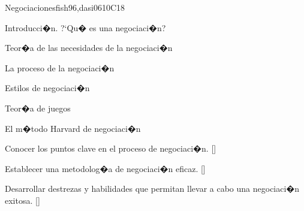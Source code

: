 \begin{syllabus}
\begin{unit}{}{Negociaciones}{fish96,dasi06}{10}{C18}
\begin{topics}
      \item Introducci�n. ?`Qu� es una negociaci�n?
      \item Teor�a de las necesidades de la negociaci�n
      \item La proceso de la negociaci�n
      \item Estilos de negociaci�n
      \item Teor�a de juegos
      \item El m�todo Harvard de negociaci�n
   \end{topics}
   \begin{learningoutcomes}
      \item Conocer los puntos clave en el proceso de negociaci�n. [\Usage]
      \item Establecer una metodolog�a de negociaci�n eficaz. [\Usage]
      \item Desarrollar destrezas y habilidades que permitan llevar a cabo una negociaci�n exitosa. [\Usage]
   \end{learningoutcomes}
\end{unit}


\begin{coursebibliography}
\end{coursebibliography}

\end{syllabus}

%
